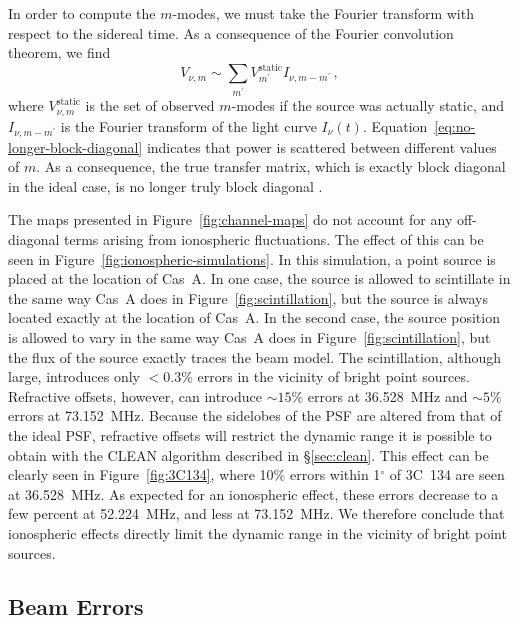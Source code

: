 \begin{bibunit}
In order to compute the $m$-modes, we must take the Fourier transform with respect to the sidereal
time. As a consequence of the Fourier convolution theorem, we find
\begin{equation}\label{eq:no-longer-block-diagonal}
    V_{\nu, m} \sim \sum_{m^\prime} V_{m^\prime}^\textrm{static} I_{\nu, m-m^\prime}\,,
\end{equation}
where $V_{\nu, m}^{\textrm{static}}$ is the set of observed $m$-modes if the source was actually
static, and $I_{\nu, m-m^\prime}$ is the Fourier transform of the light curve $I_{\nu}(t)$.
Equation~\ref{eq:no-longer-block-diagonal} indicates that power is scattered between different
values of $m$. As a consequence, the true transfer matrix, which is exactly block diagonal in the
ideal case, is no longer truly block diagonal \citep{richard_ionosphere_thoughts}.

The maps presented in Figure~\ref{fig:channel-maps} do not account for any off-diagonal terms
arising from ionospheric fluctuations. The effect of this can be seen in
Figure~\ref{fig:ionospheric-simulations}. In this simulation, a point source is placed at the
location of Cas~A. In one case, the source is allowed to scintillate in the same way Cas~A does in
Figure~\ref{fig:scintillation}, but the source is always located exactly at the location of Cas~A.
In the second case, the source position is allowed to vary in the same way Cas~A does in
Figure~\ref{fig:scintillation}, but the flux of the source exactly traces the beam model. The
scintillation, although large, introduces only $<0.3\%$ errors in the vicinity of bright point
sources. Refractive offsets, however, can introduce $\sim 15\%$ errors at 36.528~MHz and $\sim 5\%$
errors at 73.152~MHz.  Because the sidelobes of the PSF are altered from that of the ideal PSF,
refractive offsets will restrict the dynamic range it is possible to obtain with the CLEAN algorithm
described in \S\ref{sec:clean}. This effect can be clearly seen in Figure~\ref{fig:3C134}, where
10\% errors within 1$^\circ$ of 3C~134 are seen at 36.528~MHz.  As expected for an ionospheric
effect, these errors decrease to a few percent at 52.224~MHz, and less at 73.152~MHz. We therefore
conclude that ionospheric effects directly limit the dynamic range in the vicinity of bright point
sources.

\subsection{Beam Errors}


\end{bibunit}
